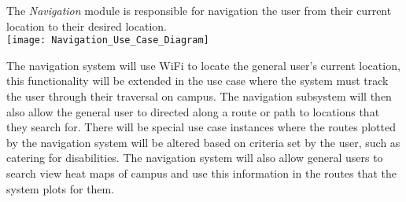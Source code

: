 The \textit{Navigation} module is responsible for navigation the user from their current location to their desired location.  \\
\texttt{[image: Navigation\_Use\_Case\_Diagram]}

{The navigation system will use WiFi to locate the general user's current location, this functionality will be extended in the use case where the system must track the user through their traversal on campus. The navigation subsystem will then also allow the general user to directed along a route or path to locations that they search for. There will be special use case instances where the routes plotted by the navigation system will be altered based on criteria set by the user, such as catering for disabilities. The navigation system will also allow general users to search view heat maps of campus and use this information in the routes that the system plots for them.}
